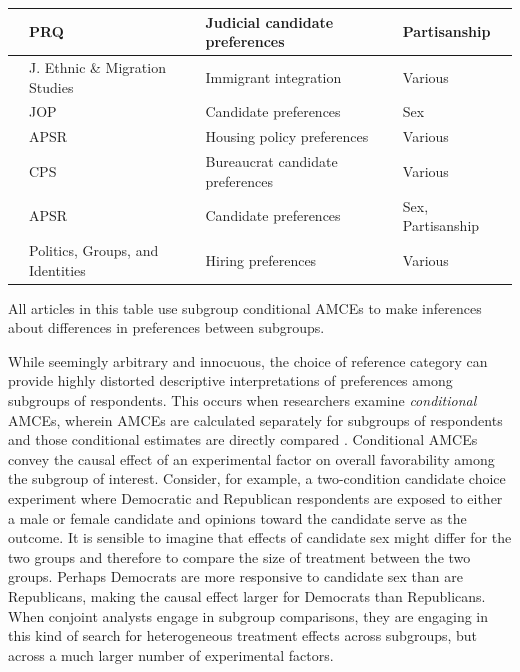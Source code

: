 \documentclass[a4paper,12pt]{article}\usepackage[]{graphicx}\usepackage[]{color}
\begin{document}
\begin{table}
\begin{center}
\begin{tabular}{p{1.5in} p{1.5in} p{1.5in} p{1.5in}}
\citet{Sen2017} & PRQ & Judicial candidate preferences & Partisanship \\ \midrule
\citet{Sobolewskaetal2017} & J. Ethnic \& Migration Studies & Immigrant integration & Various \\ \midrule
\citet{EggersVivyanWagner2018} & JOP & Candidate preferences & Sex \\ \midrule
\citet{Hankinson2018} & APSR & Housing policy preferences & Various \\ \midrule
\citet{OliverosSchuster2018} & CPS & Bureaucrat candidate preferences & Various \\ \midrule
\citet{TeeleKallaRosenbluth2018} & APSR & Candidate preferences & Sex, Partisanship \\ \midrule
\citet{Careyetal2018} & Politics, Groups, and Identities & Hiring preferences & Various \\ \midrule
\bottomrule
\end{tabular}
\end{center}

All articles in this table use subgroup conditional AMCEs to make inferences about differences in preferences between subgroups.
\end{table}

While seemingly arbitrary and innocuous, the choice of reference category can provide highly distorted descriptive interpretations of preferences among subgroups of respondents. This occurs when researchers examine \textit{conditional} AMCEs, wherein AMCEs are calculated separately for subgroups of respondents and those conditional estimates are directly compared \citep[13]{HainmuellerHopkinsYamamoto2014}. Conditional AMCEs convey the causal effect of an experimental factor on overall favorability among the subgroup of interest. Consider, for example, a two-condition candidate choice experiment where Democratic and Republican respondents are exposed to either a male or female candidate and opinions toward the candidate serve as the outcome. It is sensible to imagine that effects of candidate sex might differ for the two groups and therefore to compare the size of treatment between the two groups. Perhaps Democrats are more responsive to candidate sex than are Republicans, making the causal effect larger for Democrats than Republicans. When conjoint analysts engage in subgroup comparisons, they are engaging in this kind of search for heterogeneous treatment effects across subgroups, but across a much larger number of experimental factors.
\end{document}
